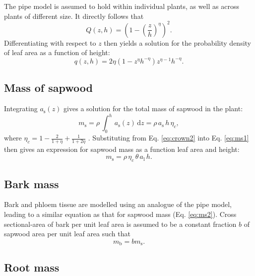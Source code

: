 \documentclass[10pt,twoside]{article}
\begin{document}
The pipe model is assumed to hold within individual plants, as well as
across plants of different size. It directly follows that
\begin{equation}\label{eq:crown1}
Q(z,h)= \left(1-\left(\frac{z}{h}\right)^\eta\right)^2.
\end{equation}
Differentiating with respect to \(z\) then yields a solution for the
probability density of leaf area as a function of height:
\begin{equation}\label{eq:crown3}
q(z,h)= 2\eta(1-z^\eta h^{-\eta})z^{\eta-1} h^{-\eta}.
\end{equation}

\subsection{Mass of sapwood}\label{mass-of-sapwood}

Integrating \(a_\textrm{s}(z)\) gives a solution for the total mass of
sapwood in the plant:
\begin{equation}\label{eq:ms1}
m_\textrm{s}=\rho \, \int_0^h \, a_\textrm{s}(z) \, \textrm{d}z= \rho \, a_\textrm{s} \, h \, \eta_c, 
\end{equation}
where \(\eta_c=1-\frac{2}{1+\eta} + \frac{1}{1+2\eta}\)
\citep{Yokozawa-1995}. Substituting from Eq. \ref{eq:crown2} into Eq.
\ref{eq:ms1} then gives an expression for sapwood mass as a function
leaf area and height:
\begin{equation}\label{eq:ms2}
m_\textrm{s}=\rho \, \eta_c \, \theta \, a_\textrm{l} \, h.
\end{equation}

\subsection{Bark mass}\label{bark-mass}

Bark and phloem tissue are modelled using an analogue of the pipe model,
leading to a similar equation as that for sapwood mass (Eq.
\ref{eq:ms2}). Cross sectional-area of bark per unit leaf area is
assumed to be a constant fraction \(b\) of sapwood area per unit leaf
area such that
\begin{equation}\label{eq:mb}
m_\textrm{b}=b m_\textrm{s}.
\end{equation}

\subsection{Root mass}\label{root-mass}
\end{document}
